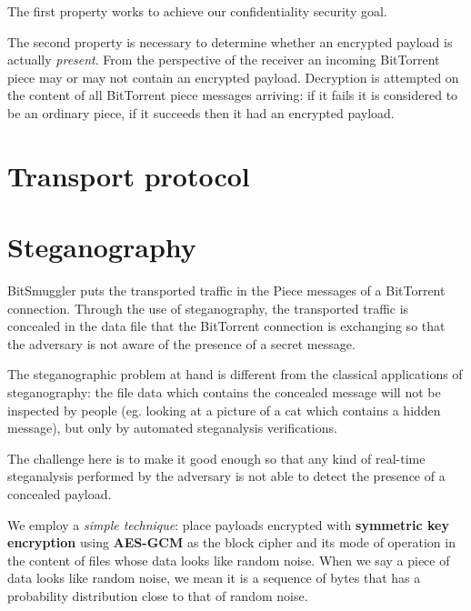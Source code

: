 \documentclass[11pt]{book} %
\newcommand{\projectName}{BitSmuggler }
\begin{document}
The first property works to achieve our confidentiality security goal.

The second property is necessary to determine whether an encrypted payload is actually \textit{present}.  From the perspective of the receiver an incoming BitTorrent piece may or may not contain an encrypted payload. Decryption is attempted on the content of all BitTorrent piece messages arriving: if it fails it is considered to be an ordinary piece, if it succeeds then it had an encrypted payload.

\section{Transport protocol}


\section{Steganography}
\label{subsec:steg}

\projectName puts the transported traffic in the Piece messages of a BitTorrent connection. Through the use of steganography, the transported traffic is concealed in the data file that the BitTorrent connection is exchanging so that the adversary is not aware of the presence of a secret message.

The steganographic problem at hand is different from the classical applications of steganography: the file data which contains the concealed message will not be inspected by people (eg. looking at a picture of a cat which contains a hidden message), but only by automated steganalysis verifications.

The challenge here is to make it good enough so that any kind of real-time steganalysis performed by the adversary is not able to detect the presence of a concealed payload.

We employ a \textit{simple technique}: place payloads encrypted with \textbf{symmetric key encryption} using \textbf{AES-GCM} as the block cipher and its mode of operation in the content of files whose data looks like random noise. When we say a piece of data looks like random noise, we mean it is a sequence of bytes that has a probability distribution close to that of random noise.
\end{document}
